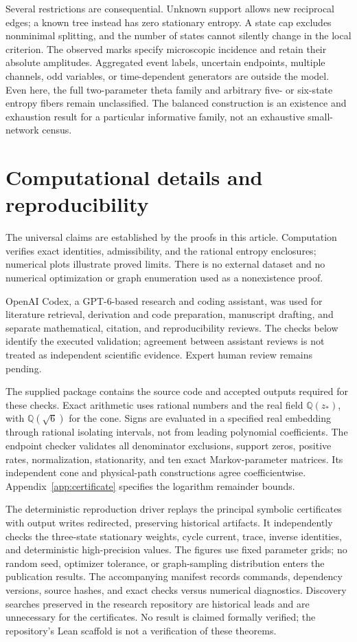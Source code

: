 \documentclass[aps,pre,onecolumn,11pt,longbibliography,notitlepage]{revtex4-2}
\newcommand{\1}{\mathbf 1}
\newcommand{\zs}{z_*}
\begin{document}
Several restrictions are consequential. Unknown support allows new reciprocal edges; a known tree instead has zero stationary entropy. A state cap excludes nonminimal splitting, and the number of states cannot silently change in the local criterion. The observed marks specify microscopic incidence and retain their absolute amplitudes. Aggregated event labels, uncertain endpoints, multiple channels, odd variables, or time-dependent generators are outside the model. Even here, the full two-parameter theta family and arbitrary five- or six-state entropy fibers remain unclassified. The balanced construction is an existence and exhaustion result for a particular informative family, not an exhaustive small-network census.

\section{Computational details and reproducibility}\label{sec:methods}
The universal claims are established by the proofs in this article. Computation verifies exact identities, admissibility, and the rational entropy enclosures; numerical plots illustrate proved limits. There is no external dataset and no numerical optimization or graph enumeration used as a nonexistence proof.

OpenAI Codex, a GPT-6-based research and coding assistant, was used for literature retrieval, derivation and code preparation, manuscript drafting, and separate mathematical, citation, and reproducibility reviews. The checks below identify the executed validation; agreement between assistant reviews is not treated as independent scientific evidence. Expert human review remains pending.

The supplied package contains the source code and accepted outputs required for these checks. Exact arithmetic uses rational numbers and the real field $\mathbb Q(\zs)$, with $\mathbb Q(\sqrt6)$ for the cone. Signs are evaluated in a specified real embedding through rational isolating intervals, not from leading polynomial coefficients. The endpoint checker validates all denominator exclusions, support zeros, positive rates, normalization, stationarity, and ten exact Markov-parameter matrices. Its independent cone and physical-path constructions agree coefficientwise. Appendix~\ref{app:certificate} specifies the logarithm remainder bounds.

The deterministic reproduction driver replays the principal symbolic certificates with output writes redirected, preserving historical artifacts. It independently checks the three-state stationary weights, cycle current, trace, inverse identities, and deterministic high-precision values. The figures use fixed parameter grids; no random seed, optimizer tolerance, or graph-sampling distribution enters the publication results. The accompanying manifest records commands, dependency versions, source hashes, and exact checks versus numerical diagnostics. Discovery searches preserved in the research repository are historical leads and are unnecessary for the certificates. No result is claimed formally verified; the repository's Lean scaffold is not a verification of these theorems.
\end{document}
